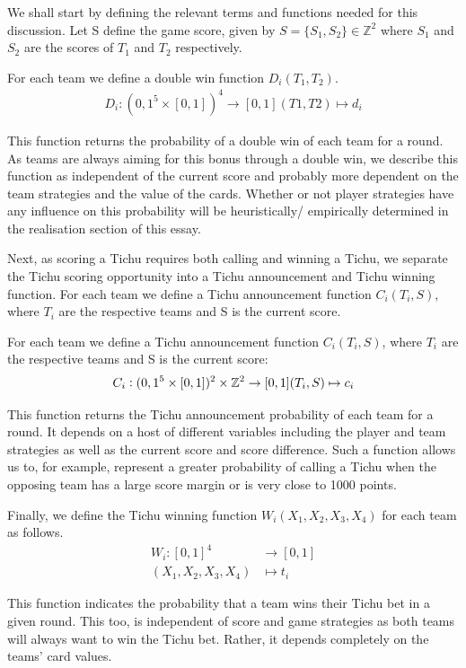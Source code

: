 We shall start by defining the relevant terms and functions needed for this discussion. Let S define the game score, given by $S = \{S_1, S_2\} \in \mathbb{Z}^2$ where $S_1$ and $S_2$ are the scores of $T_1$ and $T_2$ respectively.

\begin{definition}
For each team we define a double win function $D_i(T_1, T_2)$.
\begin{align*}
D_i: ({0,1}^5 \times [0,1])^4 \to [0,1] (T1,T2) \mapsto d_i
\end{align*}
\end{definition}
This function returns the probability of a double win of each team for a round. As teams are always aiming for this bonus through a double win, we describe this function as independent of the current score and probably more dependent on the team strategies and the value of the cards. Whether or not player strategies have any influence on this probability will be heuristically/ empirically determined in the realisation section of this essay.

Next, as scoring a Tichu requires both calling and winning a Tichu, we separate the Tichu scoring opportunity into a Tichu announcement and Tichu winning function. For each team we define a Tichu announcement function $C_i(T_i, S)$, where $T_i$ are the respective teams and S is the current score. 


\begin{definition}
For each team we define a Tichu announcement function $C_i(T_i, S)$, where $T_i$ are the respective teams and S is the current score:
\begin{align*}
C_i: ({0,1}^5 \times [0,1])^2 \times \mathbb{Z}^2 \to [0,1] (T_i,S) \mapsto c_i
\end{align*}
\end{definition}
This function returns the Tichu announcement probability of each team for a round. It depends on a host of different variables including the player and team strategies as well as the current score and score difference. Such a function allows us to, for example, represent a greater probability of calling a Tichu when the opposing team has a large score margin or is very close to 1000 points.


\begin{definition}
Finally, we define the Tichu winning function $W_i(X_1, X_2,X_3,X_4)$ for each team as follows.
\begin{align*}
W_i: [0,1]^4 &\to [0,1] \\(X_1,X_2,X_3,X_4) &\mapsto t_i
\end{align*}
\end{definition}
This function indicates the probability that a team wins their Tichu bet in a given round. This too, is independent of score and game strategies as both teams will always want to win the Tichu bet. Rather, it depends completely on the teams’ card values.

